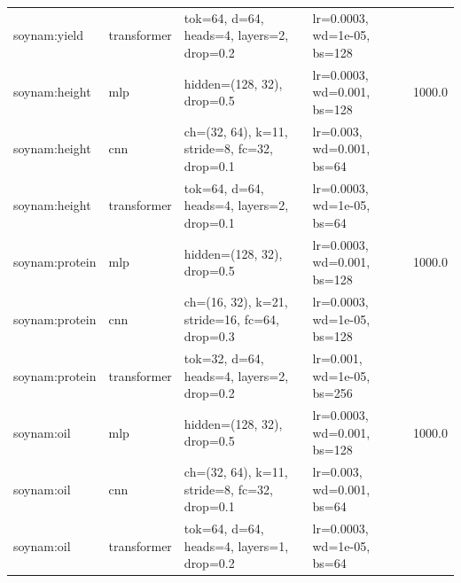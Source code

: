 \begin{longtable}{llp{4.6cm}p{3.4cm}r}
soynam:yield & transformer & tok=64, d=64, heads=4, layers=2, drop=0.2 & lr=0.0003, wd=1e-05, bs=128 &  \\
soynam:height & mlp & hidden=(128, 32), drop=0.5 & lr=0.0003, wd=0.001, bs=128 & 1000.0 \\
soynam:height & cnn & ch=(32, 64), k=11, stride=8, fc=32, drop=0.1 & lr=0.003, wd=0.001, bs=64 &  \\
soynam:height & transformer & tok=64, d=64, heads=4, layers=2, drop=0.1 & lr=0.0003, wd=1e-05, bs=64 &  \\
soynam:protein & mlp & hidden=(128, 32), drop=0.5 & lr=0.0003, wd=0.001, bs=128 & 1000.0 \\
soynam:protein & cnn & ch=(16, 32), k=21, stride=16, fc=64, drop=0.3 & lr=0.0003, wd=1e-05, bs=128 &  \\
soynam:protein & transformer & tok=32, d=64, heads=4, layers=2, drop=0.2 & lr=0.001, wd=1e-05, bs=256 &  \\
soynam:oil & mlp & hidden=(128, 32), drop=0.5 & lr=0.0003, wd=0.001, bs=128 & 1000.0 \\
soynam:oil & cnn & ch=(32, 64), k=11, stride=8, fc=32, drop=0.1 & lr=0.003, wd=0.001, bs=64 &  \\
soynam:oil & transformer & tok=64, d=64, heads=4, layers=1, drop=0.2 & lr=0.0003, wd=1e-05, bs=64 &  \\
\end{longtable}
